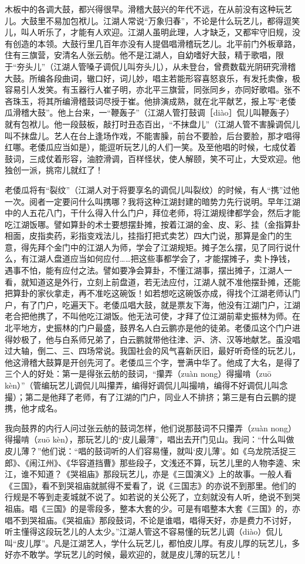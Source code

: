 \documentclass[12pt,UTF8]{ctexbook}
\begin{document}
木板中的各调大鼓，都兴得很早。滑稽大鼓兴的年代不远，在从前没有这种玩艺儿。大鼓里不易加包袱儿。江湖人常说“万象归春”，不论是什么玩艺儿，都得逗笑儿，叫人听乐了，才能有人欢迎。江湖人虽明此理，人才缺乏，又都牢守旧规，没有创造的本领。大鼓行里几百年亦没有人提倡唱滑稽玩艺儿。北平前门外板章路，住有三旗营，安清名人张云舫。他不是江湖人，自幼嗜好大鼓，精于歌唱，限于“夯头儿”（江湖人管嗓子调侃儿叫夯头儿），从未登台，曾费数载光阴研究滑稽大鼓。所编各段曲词，辙口好，词儿妙，唱主若能形容喜怒哀乐，有发托卖像，极容易引人发笑。有玉器行人崔子明，亦北平三旗营，同张同乡，亦同好歌唱。张不吝珠玉，将其所编滑稽鼓词尽授于崔。他排演成熟，就在北平献艺，报上写“老倭瓜滑稽大鼓”。他上台来，一“鞭轰子”（江湖人管打鼓调［diào］侃儿叫鞭轰子）就有包袱儿。他一段鼓板，敲打时丑态百出，“不抹盘儿”（江湖人管不害臊调侃儿叫不抹盘儿。艺人在台上逢场作戏，不能害臊，前台不要脸，后台要脸，那才唱得红哪。老倭瓜应当如是），能逗听玩艺儿的人们一笑。及至他唱的时候，七成仗着鼓词，三成仗着形容，油腔滑调，百样怪状，使人解颐，笑不可止，大受欢迎。他独创一派，挑帘儿就红了！

老倭瓜将有“裂纹”（江湖人对于将要享名的调侃儿叫裂纹）的时候，有人“携”过他一次。阅者一定要问什么叫携哪？我将这种江湖封建的暗势力先行说明。早年江湖中的人五花八门，干什么得入什么门户，拜位老师，将江湖规律都学会，然后才能吃江湖饭哪。譬如算卦的术士要想摆卦摊，按着江湖的金、皮、彩、挂（金指算卦相面，皮指卖药，彩指变戏法儿，挂指打把式卖艺）四大门说，那算是金门的生意，得先拜个金门中的江湖人为师，学会了江湖规矩。摊子怎么摆，见了同行说什么，有江湖人盘道应当如何应付……把这些事都学会了，才能摆摊子，卖卜挣钱，遇事不怕，能有应付之法。譬如要净会算卦，不懂江湖事，摆出摊子，江湖人一看，就知道这是外行，立刻上前盘道，若无法应付，江湖人就不准他摆卦摊，还能把算卦的家伙拿走，再不准吃这碗饭！如若想吃这碗饭亦成，得找个江湖老师认门户，有了门户，吃遍天下。老倭瓜唱大鼓，就是票友下海，他没有江湖门户，江湖老合把他携了，不叫他吃江湖饭。他无法可使，才拜了位江湖前辈史振林为师。在北平地方，史振林的门户最盛，鼓界名人白云鹏亦是他的徒弟。老倭瓜这个门户进得妙极了，他与白系师兄弟了，白云鹏就带他往津、沪、济、汉等地献艺。虽没唱过大轴，倒二、三、四场常说。我国社会的风气喜新厌旧，最好听奇怪的玩艺儿，他这滑稽大鼓算是开创先河了。老倭瓜三个字，誉满中华了。他成了大名，是得了三个人的好处：第一是得张云舫的鼓词，“攥弄（zuàn nong）得撮啃（zuō kèn）”（管编玩艺儿调侃儿叫攥弄，编得好调侃儿叫撮啃，编得不好调侃儿叫念撮）；第二是他拜了老师，有了江湖的门户，同业人不排挤；第三是有白云鹏的提携，他才成名。

我向鼓界的内行人问过张云舫的鼓词怎样，他们说那鼓词不只攥弄（zuàn nong）得撮啃（zuō kèn），那玩艺儿的“皮儿最薄”，唱出去开门见山。我问：“什么叫做皮儿薄？”他们说：“唱的鼓词听的人们容易懂，就叫‘皮儿薄’。如《乌龙院活捉三郎》、《闹江州》、《华容道挡曹》那些段子，文浅还不算，玩艺儿里的人物李逵、宋江，谁不知道？《哭祖庙》那段玩艺儿，亦是《三国演义》上的故事。一般人看《三国》，看不到哭祖庙就腻得不爱看了，说《三国志》的亦说不到那里。他们的行规是不等到走麦城就不说了。如若说的关公死了，立刻就没有人听，绝说不到哭祖庙。唱《三国》的是零段多，整本大套的少。可是有唱整本大套《三国》的，亦唱不到哭祖庙。《哭祖庙》那段鼓词，不论是谁唱，唱得天好，亦是费力不讨好，听主懂得这段玩艺儿的人太少。”江湖人管这不容易懂的玩艺儿调（diào）侃儿叫“皮儿厚”。凡是江湖艺人，学什么玩艺儿，都怕皮儿厚。有皮儿厚的玩艺儿，多好亦不敢学。学玩艺儿的时候，最欢迎的，就是皮儿薄的玩艺儿！
\end{document}
